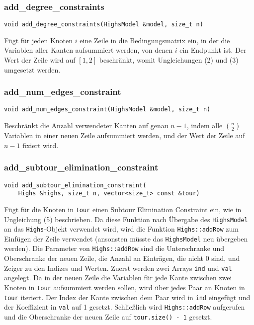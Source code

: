 \documentclass[a4paper, 10pt, ngerman]{article}
\begin{document}
\subsubsection{add\_degree\_constraints}
\verb|void add_degree_constraints(HighsModel &model, size_t n)|
\medskip

\noindent Fügt für jeden Knoten $i$ eine Zeile in die Bedingungsmatrix ein, in der die Variablen aller Kanten aufsummiert werden, von denen $i$ ein Endpunkt ist. Der Wert der Zeile wird auf $[1, 2]$ beschränkt, womit Ungleichungen (2) und (3) umgesetzt werden.

\subsubsection{add\_num\_edges\_constraint}
\verb|void add_num_edges_constraint(HighsModel &model, size_t n)|
\medskip

\noindent Beschränkt die Anzahl verwendeter Kanten auf genau $n - 1$, indem alle $\binom n 2$ Variablen in einer neuen Zeile aufsummiert werden, und der Wert der Zeile auf $n - 1$ fixiert wird.

\subsubsection{add\_subtour\_elimination\_constraint}
\verb|void add_subtour_elimination_constraint(| \\
\verb|    Highs &highs, size_t n, vector<size_t> const &tour)|
\medskip

\noindent Fügt für die Knoten in \verb|tour| einen Subtour Elimination Constraint ein, wie in Ungleichung (5) beschrieben. Da diese Funktion nach Übergabe des \verb|HighsModel| an das \verb|Highs|-Objekt verwendet wird, wird die Funktion \verb|Highs::addRow| zum Einfügen der Zeile verwendet (ansonsten müsste das \verb|HighsModel| neu übergeben werden). Die Parameter von \verb|Highs::addRow| sind die Unterschranke und Oberschranke der neuen Zeile, die Anzahl an Einträgen, die nicht 0 sind, und Zeiger zu den Indizes und Werten. Zuerst werden zwei Arrays \verb|ind| und \verb|val| angelegt. Da in der neuen Zeile die Variablen für jede Kante zwischen zwei Knoten in \verb|tour| aufsummiert werden sollen, wird über jedes Paar an Knoten in \verb|tour| iteriert. Der Index der Kante zwischen dem Paar wird in \verb|ind| eingefügt und der Koeffizient in \verb|val| auf 1 gesetzt. Schließlich wird \verb|Highs::addRow| aufgerufen und die Oberschranke der neuen Zeile auf \verb|tour.size() - 1| gesetzt.
\end{document}
